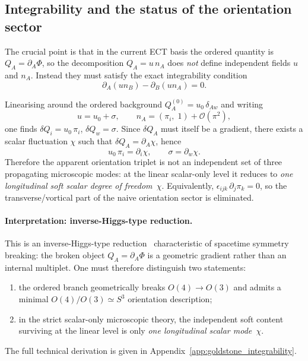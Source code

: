 \documentclass[11pt,a4paper]{article}
\numberwithin{equation}{section}
\begin{document}
\subsection{Integrability and the status of the orientation sector}
\label{sec:goldstone_integrability_main}

The crucial point is that in the current ECT basis the ordered quantity
is $Q_A=\partial_A\Phi$, so the decomposition $Q_A=u\,n_A$ does
\emph{not} define independent fields $u$ and $n_A$.
Instead they must satisfy the exact integrability condition
\begin{equation}
  \partial_A(u n_B)-\partial_B(u n_A)=0.
  \label{eq:integrability_un}
\end{equation}

Linearising around the ordered background $Q_A^{(0)} = u_0\,\delta_{Aw}$
and writing
\begin{equation}
  u=u_0+\sigma, \qquad
  n_A=(\pi_i,\;1)+\mathcal{O}(\pi^2),
\end{equation}
one finds $\delta Q_i = u_0\,\pi_i$, $\delta Q_w = \sigma$.
Since $\delta Q_A$ must itself be a gradient, there exists a scalar
fluctuation $\chi$ such that $\delta Q_A = \partial_A\chi$, hence
\begin{equation}
  u_0\,\pi_i = \partial_i\chi, \qquad \sigma = \partial_w\chi.
  \label{eq:goldstone_reduction_main}
\end{equation}
Therefore the apparent orientation triplet is not an independent set of
three propagating microscopic modes: at the linear scalar-only level it
reduces to \emph{one longitudinal soft scalar degree of freedom~$\chi$}.
Equivalently, $\epsilon_{ijk}\,\partial_j\pi_k = 0$, so the
transverse/vortical part of the naive orientation sector is eliminated.

\paragraph{Interpretation: inverse-Higgs-type reduction.}
This is an inverse-Higgs-type
reduction~\cite{Ivanov1975,McArthur2010} characteristic of spacetime
symmetry breaking: the broken object $Q_A=\partial_A\Phi$ is a
geometric gradient rather than an internal multiplet.
One must therefore distinguish two statements:
\begin{enumerate}
  \item the ordered branch geometrically breaks $O(4)\to O(3)$ and
    admits a minimal $O(4)/O(3)\simeq S^3$ orientation description;
  \item in the strict scalar-only microscopic theory, the independent
    soft content surviving at the linear level is only
    \emph{one longitudinal scalar mode~$\chi$}.
\end{enumerate}
The full technical derivation is given in
Appendix~\ref{app:goldstone_integrability}.
\end{document}
